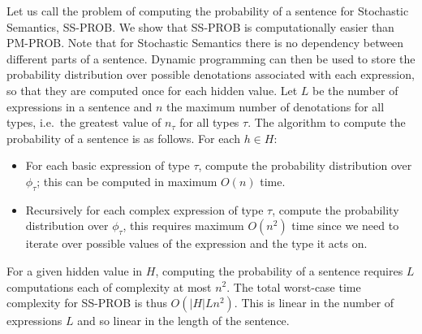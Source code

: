 \documentclass[a4paper,11pt]{article}
\theoremstyle{definition}
\begin{document}
Let us call the problem of computing the probability of a sentence for Stochastic Semantics, SS-PROB. We show that SS-PROB is computationally easier than PM-PROB.
Note that for Stochastic Semantics there is no dependency between different parts of a sentence.
Dynamic
programming can then be used to store the probability distribution over possible
denotations associated with each expression, so that they are computed once for
each hidden value. Let $L$ be the number of expressions in a sentence and
$n$ the maximum number of denotations for all types, i.e.~the greatest
value of $n_\tau$ for all types $\tau$. The algorithm to compute the
probability of a sentence is as follows. For each $h\in H$:
\begin{itemize}
\item For each basic expression of type $\tau$, compute the
  probability distribution over $\phi_\tau$; this can be computed in
  maximum $O(n)$ time.
\item Recursively for each complex expression of type $\tau$, compute
  the probability distribution over $\phi_\tau$, this requires maximum
  $O(n^2)$ time since we need to iterate over possible values of the
  expression and the type it acts on.
\end{itemize}
For a given hidden value in $H$, computing the probability of a sentence requires $L$
computations each of complexity at most $n^2$. The total worst-case
time complexity for SS-PROB is thus $O(|H|Ln^2)$. This is linear in the number of expressions $L$ and so linear in the length of the sentence. 





\end{document}
